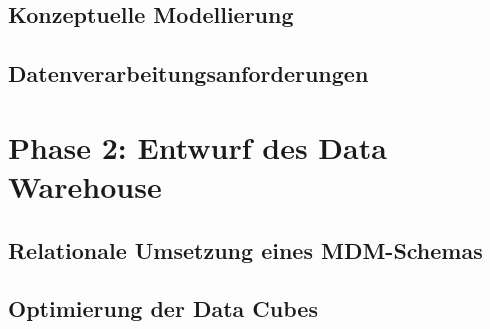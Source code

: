 \subsection{Konzeptuelle Modellierung}
\label{ref:modellierung}

\subsection{Datenverarbeitungsanforderungen}
\label{ref:businessSicht}

\section{Phase 2: Entwurf des Data Warehouse}

\subsection{Relationale Umsetzung eines MDM-Schemas}
\label{ref:mdmSchema}

\subsection{Optimierung der Data Cubes}
\label{ref:optimierung}

